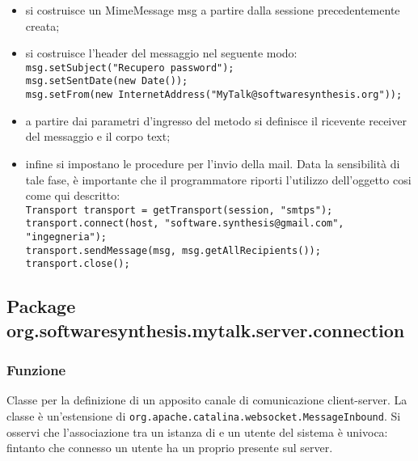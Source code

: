 \begin{description}
\begin{itemize}
	\item si costruisce un MimeMessage msg a partire dalla sessione precedentemente creata;
	\item si costruisce l'header del messaggio nel seguente modo:\\
	
		\verb|msg.setSubject("Recupero password");|\\
	    \verb|msg.setSentDate(new Date());|\\
	    \verb|msg.setFrom(new InternetAddress("MyTalk@softwaresynthesis.org"));|\\
	\item a partire dai parametri d'ingresso del metodo si definisce il ricevente receiver del messaggio e il corpo text;
	\item infine si impostano le procedure per l'invio della mail. Data la sensibilità di tale fase, è importante che il programmatore riporti l'utilizzo dell'oggetto  cosi come qui descritto:\\
	
		\verb|Transport transport = getTransport(session, "smtps");|\\
		\verb|transport.connect(host, "software.synthesis@gmail.com", "ingegneria");|\\
		\verb|transport.sendMessage(msg, msg.getAllRecipients());|\\
		\verb|transport.close();|
\end{itemize}

\end{description}

\subsection{Package org.softwaresynthesis.mytalk.server.connection}\label{sec:connection}


\subsubsection*{Funzione}
Classe per la definizione di un apposito canale di comunicazione client-server. La classe è un'estensione di \texttt{org.apache.catalina.websocket.MessageInbound}. Si osservi che l'associazione tra un istanza di  e un utente del sistema è univoca: fintanto che connesso un utente ha un proprio  presente sul server.

